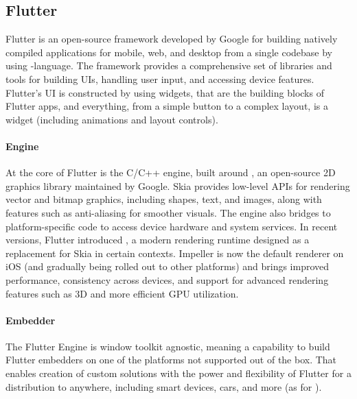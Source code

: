 
\subsection{Flutter}

Flutter is an open-source framework developed by Google for building natively compiled applications for mobile, web, and 
desktop from a single codebase by using -language. The framework provides a comprehensive set of libraries and 
tools for building UIs, handling user input, and accessing device features. Flutter's UI is constructed by using widgets, 
that are the building blocks of Flutter apps, and everything, from a simple button to a complex layout, is a widget
(including animations and layout controls).

\paragraph{Engine} At the core of Flutter is the C/C++ engine, built around , an open-source 2D graphics 
library maintained by Google. Skia provides low-level APIs for rendering vector and bitmap graphics, including shapes, 
text, and images, along with features such as anti-aliasing for smoother visuals. The engine also bridges to 
platform-specific code to access device hardware and system services. In recent versions, Flutter introduced 
, a modern rendering runtime designed as a replacement for Skia in certain contexts. Impeller is now the 
default renderer on iOS (and gradually being rolled out to other platforms) and brings improved performance, 
consistency across devices, and support for advanced rendering features such as 3D and more efficient GPU utilization.

\paragraph{Embedder} The Flutter Engine is window toolkit agnostic, meaning a capability to build Flutter embedders on 
one of the platforms not supported out of the box. That enables creation of custom solutions with the power and 
flexibility of Flutter for a distribution to anywhere, including smart devices, cars, and more (as  
for ).

